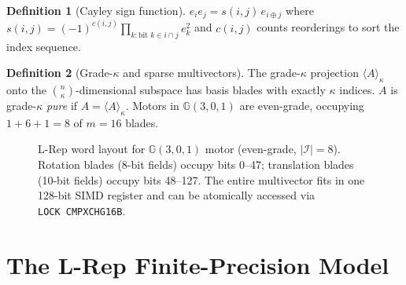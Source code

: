 \documentclass[11pt,a4paper]{article}
\theoremstyle{definition}
\newtheorem{definition}{Definition}[section]
\theoremstyle{plain}
\theoremstyle{remark}
\newcommand{\GA}{\mathbb{G}}
\begin{document}
\begin{definition}[Cayley sign function]
\label{def:cayley}
$e_i e_j = s(i,j)\,e_{i\oplus j}$ where
$s(i,j) = (-1)^{c(i,j)}\prod_{k:\text{bit }k\in i\cap j}e_k^2$
and $c(i,j)$ counts reorderings to sort the index sequence.
\end{definition}

\begin{definition}[Grade-$\kappa$ and sparse multivectors]
\label{def:grade}
The grade-$\kappa$ projection $\langle A\rangle_\kappa$ onto the
$\binom{n}{\kappa}$-dimensional subspace has basis blades with exactly
$\kappa$ indices.
$A$ is grade-$\kappa$ \emph{pure} if $A=\langle A\rangle_\kappa$.
Motors in $\GA(3,0,1)$ are even-grade, occupying
$1+6+1=8$ of $m=16$ blades.
\end{definition}

\begin{figure}[h]
\centering
{}
\caption{L-Rep word layout for $\GA(3,0,1)$ motor (even-grade, $|\mathcal{I}|=8$).
Rotation blades (8-bit fields) occupy bits 0--47;
translation blades (10-bit fields) occupy bits 48--127.
The entire multivector fits in one 128-bit SIMD register and can be
atomically accessed via \texttt{LOCK~CMPXCHG16B}.}
\label{fig:layout}
\end{figure}

\section{The L-Rep Finite-Precision Model}
\label{sec:model}
\end{document}

